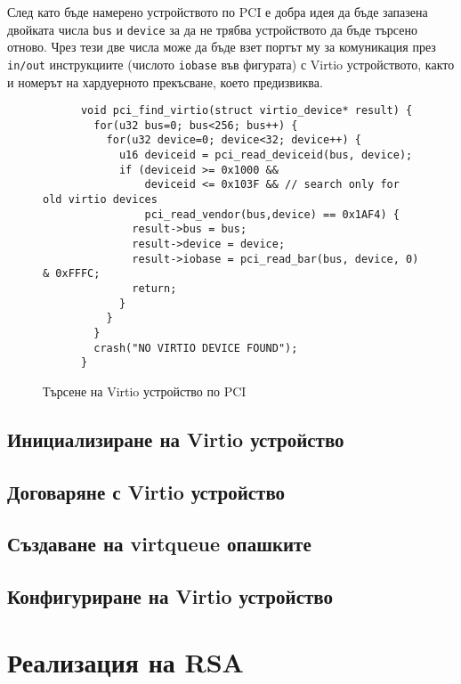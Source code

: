   След като бъде намерено устройството по PCI е добра идея да бъде запазена двойката числа {\tt bus} и {\tt device} за да не трябва устройството да бъде търсено отново. Чрез тези две числа може да бъде взет портът му за комуникация през {\tt in/out} инструкциите (числото {\tt iobase} във фигурата) с Virtio устройството, както и номерът на хардуерното прекъсване, което предизвиква.

  \begin{figure}[ht]
    \centering
    \begin{verbatim}
      void pci_find_virtio(struct virtio_device* result) {
        for(u32 bus=0; bus<256; bus++) {
          for(u32 device=0; device<32; device++) {
            u16 deviceid = pci_read_deviceid(bus, device);
            if (deviceid >= 0x1000 &&
                deviceid <= 0x103F && // search only for old virtio devices
                pci_read_vendor(bus,device) == 0x1AF4) {
              result->bus = bus;
              result->device = device;
              result->iobase = pci_read_bar(bus, device, 0) & 0xFFFC;
              return;
            }
          }
        }
        crash("NO VIRTIO DEVICE FOUND");
      }
    \end{verbatim}
    \caption{Търсене на Virtio устройство по PCI}
    \label{fig:finding-virtio}
  \end{figure}

  \subsection{Инициализиране на Virtio устройство}

  \subsection{Договаряне с Virtio устройство}

  \subsection{Създаване на virtqueue опашките}

  \subsection{Конфигуриране на Virtio устройство}

\section{Реализация на RSA}
